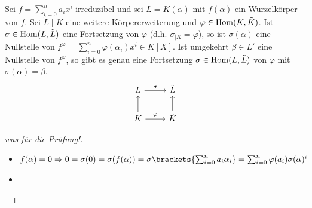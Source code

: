 \begin{lemma}
	Sei $f = \sum_{i=0}^n a_i x^i$ irreduzibel und sei $L = K(\alpha)$ mit $f(\alpha)$ ein Wurzelkörper von $f$. Sei $\tilde{L}\mid \tilde{K}$ eine weitere Körpererweiterung und $\varphi \in \operatorname{Hom}(K,\tilde{K})$. Ist $\sigma \in \operatorname{Hom}(L,\tilde{L})$ eine Fortsetzung von $\varphi$ (d.h. $\sigma_{\mid K} = \varphi$), so ist $\sigma(\alpha)$ eine Nullstelle von $f^{\varphi}=\sum_{i=0}^n \varphi(\alpha_i)x^i \in K[X]$. Ist umgekehrt $\beta \in L' $ eine Nullstelle von $f^{\varphi}$, so gibt es genau eine Fortsetzung $\sigma \in \operatorname{Hom}(L,\tilde{L})$ von $\varphi$ mit $\sigma(\alpha) = \beta$. %
	\begin{align*}
		\begin{tikzcd}
			L \arrow[r, "\sigma"]            & \tilde{L}           \\
			K \arrow[r, "\varphi"] \arrow[u] & \tilde{K} \arrow[u]
		\end{tikzcd}
	\end{align*}
\end{lemma}
\begin{proof}[was für die Prüfung!]
	\begin{itemize}
		\item $f(\alpha) = 0 \Rightarrow 0 = \sigma(0) = \sigma(f(\alpha)) = \sigma\brackets{\sum_{i=0}^n a_i \alpha_i} = \sum_{i=0}^n \varphi(a_i)\sigma(\alpha)^i$
		\item 
	\end{itemize}
\end{proof}
